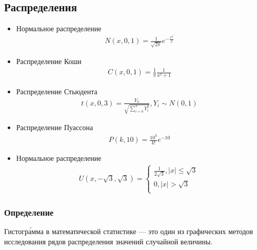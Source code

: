 \subsection{Распределения}
\begin{itemize}
    \item  Нормальное распределение \begin{gather*}
 N(x,0,1) = \frac{1}{\sqrt{2\pi}}e^{-\frac{x^{2}}{2}}
\end{gather*} 
    \item  Распределение Коши  
    \begin{gather*}
    C(x,0,1) = \frac{1}{\pi}\frac{1}{x^{2} + 1}
\end{gather*} 
    \item  Распределение Стьюдента   \begin{gather*}
 t(x,0,3) = \frac{Y_0}{\sqrt{\displaystyle\sum_{i=0}^{3} Y_i^{2}}}, Y_i \sim N(0,1)
\end{gather*} 
    \item  Распределение Пуассона
    \begin{gather*}
 P(k,10) = \frac{10^{k}}{k!}e^{-10}
\end{gather*} 
    \item  Нормальное распределение
    \begin{gather*}
U(x,-\sqrt{3}, \sqrt{3}) = \begin{cases}
\frac{1}{2\sqrt{3}}, |x| \leq \sqrt{3}\\
0,  |x| > \sqrt{3} \\ 
\end{cases}
\end{gather*}

\end{itemize}


\subsubsection{Определение}
Гистогра́мма в математической статистике — это один из графических методов исследования рядов распределения значений случайной величины.
